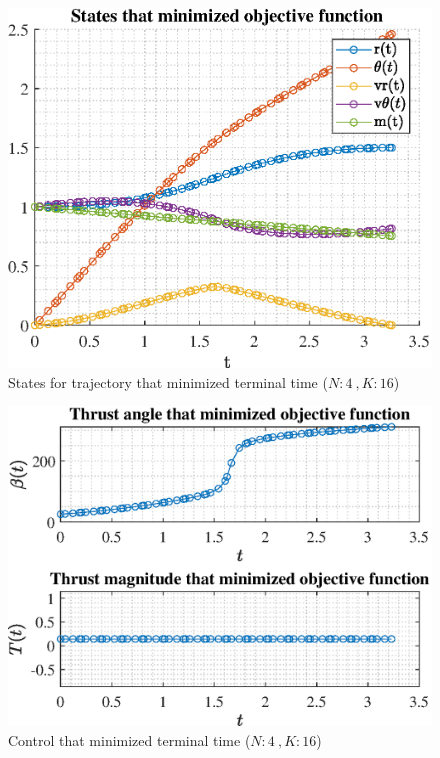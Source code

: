 \documentclass[]{article}
\begin{document}
\begin{figure}
	\centering
	\includegraphics[scale=0.75]{states_N4_K16_C3_tf.eps}
	\caption{States for trajectory that minimized terminal time (\(N:4\ , K:16\))}
	\label{fig:states_N4_K16_C3_tf}
\end{figure}
\begin{figure}
	\centering
	\includegraphics[scale=0.75]{control_N4_K16_C3_tf.eps}
	\caption{Control that minimized terminal time (\(N:4\ , K:16\))}
	\label{fig:control_N4_K16_C3_tf}
\end{figure}
\end{document}
